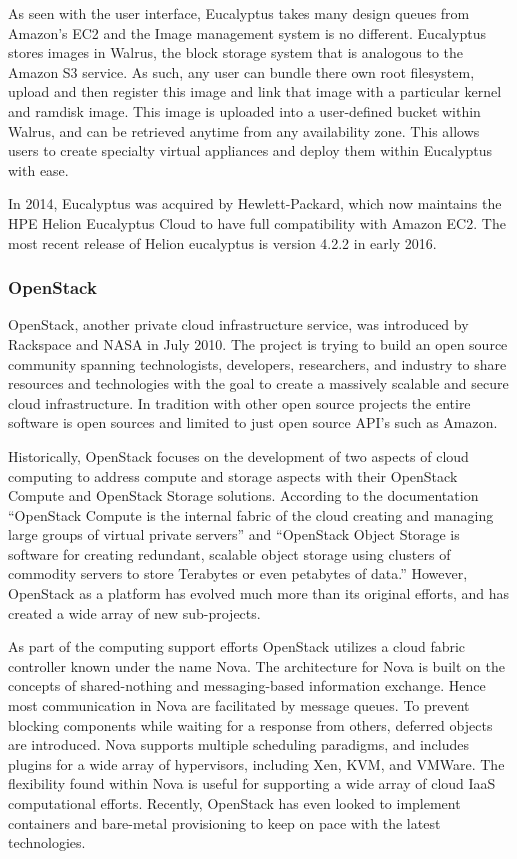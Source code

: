 As seen with the user interface, Eucalyptus takes many design queues from Amazon’s EC2 and the Image management system is no different.  Eucalyptus stores images in Walrus, the block storage system that is analogous to the Amazon S3 service.  As such, any user can bundle there own root filesystem, upload and then register this image and link that image with a particular kernel and ramdisk image.  This image is uploaded into a user-defined bucket within Walrus, and can be retrieved anytime from any availability zone.  This allows users to create specialty virtual appliances and deploy them within Eucalyptus with ease.  

In 2014, Eucalyptus was acquired by Hewlett-Packard, which now maintains the HPE Helion Eucalyptus Cloud to have full compatibility with Amazon EC2. The most recent release of Helion eucalyptus is version 4.2.2 in early 2016.  

\subsubsection{OpenStack}

OpenStack, another private cloud infrastructure service, was introduced by Rackspace and NASA in July 2010. The project is trying to build an open source community spanning technologists, developers, researchers, and industry to share resources and technologies with the goal to create a massively scalable and secure cloud infrastructure. In tradition with other open source projects the entire software is open sources and limited to just open source API's such as Amazon.

 
Historically, OpenStack focuses on the development of two aspects of cloud computing to address compute and storage aspects with their OpenStack Compute and OpenStack Storage solutions. According to the documentation ``OpenStack Compute is the internal fabric of the cloud creating and managing large groups of virtual private servers'' and ``OpenStack Object Storage is software for creating redundant, scalable object storage using clusters of commodity servers to store Terabytes or even petabytes of data.''    However, OpenStack as a platform has evolved much more than its original efforts, and has created a wide array of new sub-projects. 

As part of the computing support efforts OpenStack \cite{www/openstack} utilizes a cloud fabric controller known under the name Nova. The architecture for Nova is built on the concepts of  shared-nothing and  messaging-based information exchange. Hence most communication in Nova are facilitated by message queues. To prevent blocking components while waiting for a response from others, deferred objects are introduced.  Nova supports multiple scheduling paradigms, and includes plugins for a wide array of hypervisors, including Xen, KVM, and VMWare.  The flexibility found within Nova is useful for supporting a wide array of cloud IaaS computational efforts. Recently, OpenStack has even looked to implement containers and bare-metal provisioning to keep on pace with the latest technologies.  

